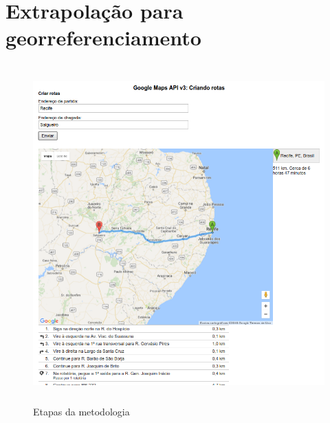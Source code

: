 \pagebreak

\section{Extrapolação para georreferenciamento}

\begin{figure}[ht]
	\centering
	\caption{Etapas da metodologia}
	\includegraphics[width=150mm, height=130mm]{Figuras/Cronograma/GoogleMaps.png}
\end{figure}



